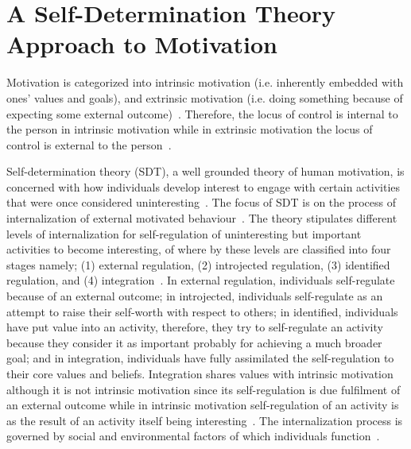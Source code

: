 \section{A Self-Determination Theory Approach to Motivation}
Motivation is categorized into intrinsic motivation (i.e. inherently embedded with ones' values and goals), and extrinsic motivation (i.e. doing something because of expecting some external outcome)~\citep{ryan2000intrinsic}. Therefore, the locus of control is internal to the person in intrinsic motivation while in extrinsic motivation the locus of control is external to the person~\citep{lee2015:relating}.

Self-determination theory (SDT)\citep{deci1985:intrinsic}, a well grounded theory of human motivation, is concerned with how individuals develop interest to engage with certain activities that were once considered uninteresting~\citep{ryan2000intrinsic}. The focus of SDT is on the process of internalization of external motivated behaviour~\citep{ryan2000intrinsic}. The theory stipulates different levels of internalization for self-regulation of uninteresting but important activities to become interesting, of where by these levels are classified into four stages namely; (1) external regulation, (2) introjected regulation, (3) identified regulation, and (4) integration~\citep{ryan2000intrinsic}. In external regulation, individuals self-regulate because of an external outcome; in introjected, individuals self-regulate as an attempt to raise their self-worth with respect to others; in identified, individuals have put value into an activity, therefore, they try to self-regulate an activity because they consider it as important probably for achieving a much broader goal; and in integration, individuals have fully assimilated the self-regulation to their core values and beliefs.  Integration shares values with intrinsic motivation although it is not intrinsic motivation since its self-regulation is due fulfilment of an external outcome while in intrinsic motivation self-regulation of an activity is as the result of an activity itself being interesting~\citep{ryan2000intrinsic}. The internalization process is governed by social and environmental factors of which individuals function~\citep{ryan2000:self,lee2015:relating}.

